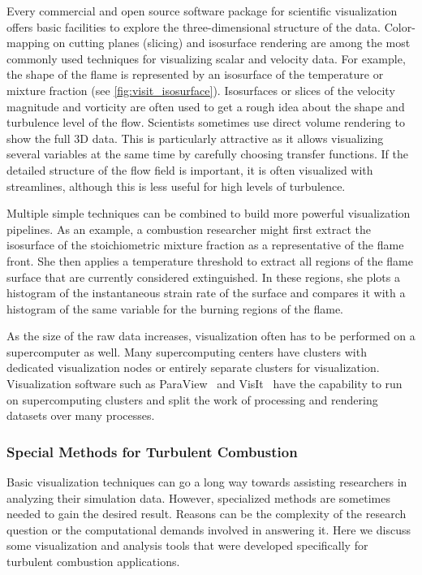 %
Every commercial and open source software package for scientific visualization
offers basic facilities to explore the three-dimensional structure of the data.
%
Color-mapping on cutting planes (slicing) and isosurface rendering are among
the most commonly used techniques for visualizing scalar and velocity data.
%
For example, the shape of the flame is represented by an isosurface of the
temperature or mixture fraction (see \cref{fig:visit_isosurface}).
%
Isosurfaces or slices of the velocity magnitude and vorticity are often used to
get a rough idea about the shape and turbulence level of the flow.
%
Scientists sometimes use direct volume rendering to show the full \ac{3D} data.
%
This is particularly attractive as it allows visualizing several variables at
the same time by carefully choosing transfer functions.
%
If the detailed structure of the flow field is important, it is often visualized
with streamlines, although this is less useful for high levels of turbulence.
%

%
Multiple simple techniques can be combined to build more powerful visualization
pipelines.
%
As an example, a combustion researcher might first extract the isosurface of
the stoichiometric mixture fraction as a representative of the flame front.
%
She then applies a temperature threshold to extract all regions of the flame
surface that are currently considered extinguished.
%
In these regions, she plots a histogram of the instantaneous strain rate of the
surface and compares it with a histogram of the same variable for the burning
regions of the flame.
%

%
As the size of the raw data increases, visualization often has to be performed
on a supercomputer as well.
%
Many supercomputing centers have clusters with dedicated visualization nodes or
entirely separate clusters for visualization.
%
Visualization software such as ParaView~\cite{Ahrens2005} and
VisIt~\cite{HPV:VisIt} have the capability to run on supercomputing clusters
and split the work of processing and rendering datasets over many processes.
%
%
\subsubsection{Special Methods for Turbulent Combustion} %
\label{ssub:special_methods_for_turbulent_combustion}
%
Basic visualization techniques can go a long way towards assisting researchers
in analyzing their simulation data.
%
However, specialized methods are sometimes needed to gain the desired result.
%
Reasons can be the complexity of the research question or the computational
demands involved in answering it.
%
Here we discuss some visualization and analysis tools that were developed
specifically for turbulent combustion applications.
%

